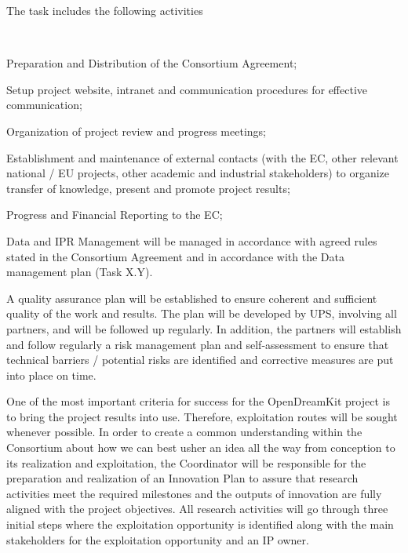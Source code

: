 \begin{workpackage}
\begin{tasklist}
\begin{task}[title=Project and financial management,
id=project-finance-management,lead=UPS,PM=33]
The task includes the following activities
  \begin{compactitem}
\item Preparation and Distribution of the Consortium Agreement;
\item Setup project website, intranet and communication procedures for effective communication;
\item Organization of project review and progress meetings;
\item Establishment and maintenance of external contacts (with the EC, 
other relevant national / EU projects, other academic and industrial stakeholders) to organize transfer of knowledge, present and
promote project results;
\item Progress and Financial Reporting to the EC;
\item Data and IPR Management will be managed in accordance with agreed rules stated in the
Consortium Agreement and in accordance with the Data management plan (Task X.Y).
  \end{compactitem}
\end{task}

\begin{task}[title=Quality assurance and risk management,
id=project-finance-management,lead=UPS,PM=15]
A quality assurance plan will be established to ensure coherent and sufficient quality of the work
and results. The plan will be developed by UPS, involving all partners, and will be followed up
regularly. In addition, the partners will establish and follow regularly a risk management plan
and self-assessment to ensure that technical barriers / potential risks are identified  and corrective measures are put into place on time.
\end{task}

\begin{task}[title=Innovation management,
id=project-finance-management,lead=UPS,PM=10]

One of the most important criteria for success for the OpenDreamKit project is to bring the project results into use. Therefore, exploitation routes will be sought whenever possible. In
order to create a common understanding within the Consortium about how we can best usher
an idea all the way from conception to its realization and exploitation, the Coordinator will be responsible for
the preparation and realization of an Innovation Plan to assure that research activities meet the
required milestones and the outputs of innovation are fully aligned with the project objectives.
All research activities will go through three initial steps where the exploitation opportunity is
identified along with the main stakeholders for the exploitation opportunity and an IP owner.
\end{task}
\end{tasklist}


\end{workpackage}
